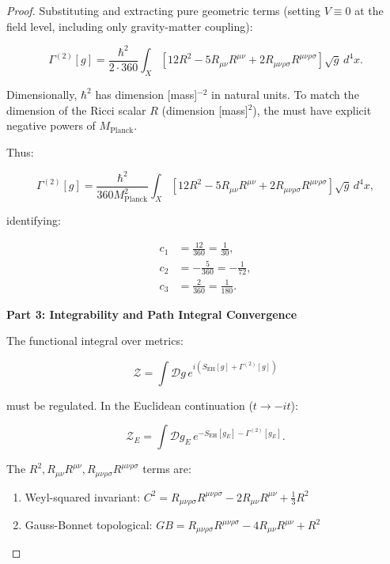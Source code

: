 \begin{theorem}
\begin{proof}
Substituting and extracting pure geometric terms (setting $V \equiv 0$ at the field level, including only gravity-matter coupling):

\begin{equation}
\Gamma^{(2)}[g] = \frac{\hbar^2}{2 \cdot 360} \int_X [12R^2 - 5R_{\mu\nu}R^{\mu\nu} + 2R_{\mu\nu\rho\sigma}R^{\mu\nu\rho\sigma}] \sqrt{g} \, d^4x.
\end{equation}

Dimensionally, $\hbar^2$ has dimension [mass]$^{-2}$ in natural units. To match the dimension of the Ricci scalar $R$ (dimension [mass]$^2$), the must have explicit negative powers of $M_{\text{Planck}}$.

Thus:

\begin{equation}
\Gamma^{(2)}[g] = \frac{\hbar^2}{360 M_{\text{Planck}}^2} \int_X [12R^2 - 5R_{\mu\nu}R^{\mu\nu} + 2R_{\mu\nu\rho\sigma}R^{\mu\nu\rho\sigma}] \sqrt{g} \, d^4x,
\end{equation}

identifying:

\begin{align}
c_1 &= \frac{12}{360} = \frac{1}{30}, \\
c_2 &= -\frac{5}{360} = -\frac{1}{72}, \\
c_3 &= \frac{2}{360} = \frac{1}{180}.
\end{align}

\textbf{Part 3: Integrability and Path Integral Convergence}

The functional integral over metrics:

\begin{equation}
\mathcal{Z} = \int \mathcal{D}g \, e^{i(S_{\text{EH}}[g] + \Gamma^{(2)}[g])}
\end{equation}

must be regulated. In the Euclidean continuation ($t \to -it$):

\begin{equation}
\mathcal{Z}_E = \int \mathcal{D}g_E \, e^{-S_{\text{EH}}[g_E] - \Gamma^{(2)}[g_E]}.
\end{equation}

The $R^2, R_{\mu\nu}R^{\mu\nu}, R_{\mu\nu\rho\sigma}R^{\mu\nu\rho\sigma}$ terms are:

\begin{enumerate}
\item[(a)] Weyl-squared invariant: $C^2 = R_{\mu\nu\rho\sigma}R^{\mu\nu\rho\sigma} - 2R_{\mu\nu}R^{\mu\nu} + \frac{1}{3}R^2$
\item[(b)] Gauss-Bonnet topological: $GB = R_{\mu\nu\rho\sigma}R^{\mu\nu\rho\sigma} - 4R_{\mu\nu}R^{\mu\nu} + R^2$
\end{enumerate}


\end{proof}
\end{theorem}
